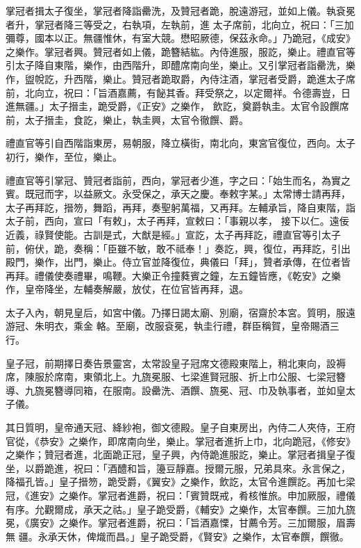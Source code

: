 \begin{pinyinscope}
 掌冠者揖太子復坐，掌冠者降詣罍洗，及贊冠者跪，脫遠游冠，並如上儀。執袞冕者升，掌冠者降三等受之，右執項，左執前，進
 太子席前，北向立，祝曰：「三加彌尊，國本以正。無疆惟休，有室大競。懋昭厥德，保茲永命。」乃跪冠，《成安》之樂作。掌冠者興。贊冠者如上儀，跪簪結紘。內侍進服，服訖，樂止。禮直官等引太子降自東階，樂作，由西階升，即醴席南向坐，樂止。又引掌冠者詣罍洗，樂作，盥帨訖，升西階，樂止。贊冠者跪取爵，內侍注酒，掌冠者受爵，跪進太子席前，北向立，祝曰：「旨酒嘉薦，有飶其香。拜受祭之，以定爾祥。令德壽豈，日進無疆。」太子搢圭，跪受爵，《正安》之樂作，
 飲訖，奠爵執圭。太官令設饌席前，太子搢圭，食訖，樂止，執圭興，太官令徹饌、爵。



 禮直官等引自西階詣東房，易朝服，降立橫街，南北向，東宮官復位，西向。太子初行，樂作，至位，樂止。



 禮直官等引掌冠、贊冠者詣前，西向，掌冠者少進，字之曰：「始生而名，為實之賓。既冠而字，以益厥文。永受保之，承天之慶。奉敕字某。」太常博士請再拜，太子再拜訖，搢笏，舞蹈，再拜，奏聖躬萬福，又再拜。左輔承旨，降自東階，詣太子前，西向，宣曰「有敕」，太子再拜，宣敕曰：「事親以孝，
 接下以仁。遠佞近義，祿賢使能。古訓是式，大猷是經。」宣訖，太子再拜訖，禮直官等引太子前，俯伏，跪，奏稱：「臣雖不敏，敢不祗奉！」奏訖，興，復位，再拜訖，引出殿門，樂作，出門，樂止。侍立官並降復位，典儀曰「拜」，贊者承傳，在位者皆再拜。禮儀使奏禮畢，鳴鞭。大樂正令撞蕤賓之鐘，左五鐘皆應，《乾安》之樂作，皇帝降坐，左輔奏解嚴，放仗，在位官皆再拜，退。



 太子入內，朝見皇后，如宮中儀。乃擇日謁太廟、別廟，宿齋於本宮。質明，服遠游冠、朱明衣，乘金
 輅。至廟，改服袞冕，執圭行禮，群臣稱賀，皇帝賜酒三行。



 皇子冠，前期擇日奏告景靈宮，太常設皇子冠席文德殿東階上，稍北東向，設褥席，陳服於席南，東領北上。九旒冕服、七梁進賢冠服、折上巾公服、七梁冠簪導、九旒冕簪導同箱，在服南。設罍洗、酒饌、旒冕、冠、巾及執事者，並如皇太子儀。



 其日質明，皇帝通天冠、絳紗袍，御文德殿。皇子自東房出，內侍二人夾侍，王府官從，《恭安》之樂作，即席南向坐，樂止。掌冠者進折上巾，北向跪冠，《修安》
 之樂作；贊冠者進，北面跪正冠，皇子興，內侍跪進服訖，樂止。掌冠者揖皇子復坐，以爵跪進，祝曰：「酒醴和旨，籩豆靜嘉。授爾元服，兄弟具來。永言保之，降福孔皆。」皇子搢笏，跪受爵，《翼安》之樂作，飲訖，太官令進饌訖。再加七梁冠，《進安》之樂作。掌冠者進爵，祝曰：「賓贊既戒，肴核惟旅。申加厥服，禮儀有序。允觀爾成，承天之祜。」皇子跪受爵，《輔安》之樂作，太官奉饌。三加九旒冕，《廣安》之樂作。掌冠者進爵，祝曰：「旨酒嘉慄，甘薦令芳。三加爾服，眉壽無
 疆。永承天休，俾熾而昌。」皇子跪受爵，《賢安》之樂作，太官奉饌，饌徹。




\end{pinyinscope}
